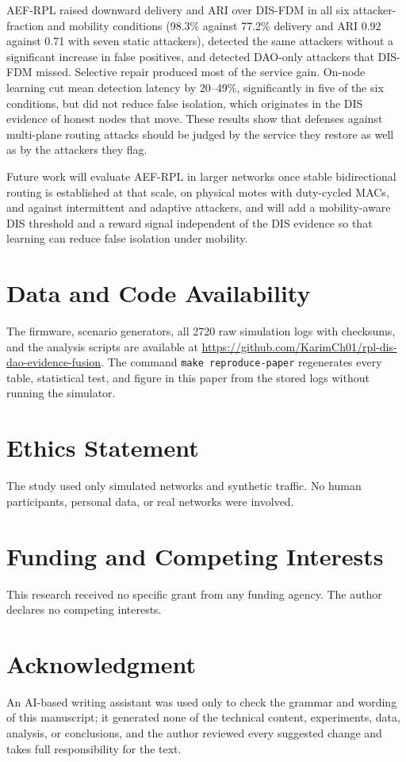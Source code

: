 AEF-RPL raised downward delivery and ARI over DIS-FDM in all six attacker-fraction and mobility conditions (98.3\% against 77.2\% delivery and ARI 0.92 against 0.71 with seven static attackers), detected the same attackers without a significant increase in false positives, and detected DAO-only attackers that DIS-FDM missed. Selective repair produced most of the service gain. On-node learning cut mean detection latency by 20--49\%, significantly in five of the six conditions, but did not reduce false isolation, which originates in the DIS evidence of honest nodes that move. These results show that defenses against multi-plane routing attacks should be judged by the service they restore as well as by the attackers they flag.

Future work will evaluate AEF-RPL in larger networks once stable bidirectional routing is established at that scale, on physical motes with duty-cycled MACs, and against intermittent and adaptive attackers, and will add a mobility-aware DIS threshold and a reward signal independent of the DIS evidence so that learning can reduce false isolation under mobility.

\section*{Data and Code Availability}
The firmware, scenario generators, all 2720 raw simulation logs with checksums, and the analysis scripts are available at \url{https://github.com/KarimCh01/rpl-dis-dao-evidence-fusion}. The command \texttt{make reproduce-paper} regenerates every table, statistical test, and figure in this paper from the stored logs without running the simulator.

\section*{Ethics Statement}
The study used only simulated networks and synthetic traffic. No human participants, personal data, or real networks were involved.


\section*{Funding and Competing Interests}
This research received no specific grant from any funding agency. The author declares no competing interests.

\section*{Acknowledgment}
An AI-based writing assistant was used only to check the grammar and wording of this manuscript; it generated none of the technical content, experiments, data, analysis, or conclusions, and the author reviewed every suggested change and takes full responsibility for the text.

